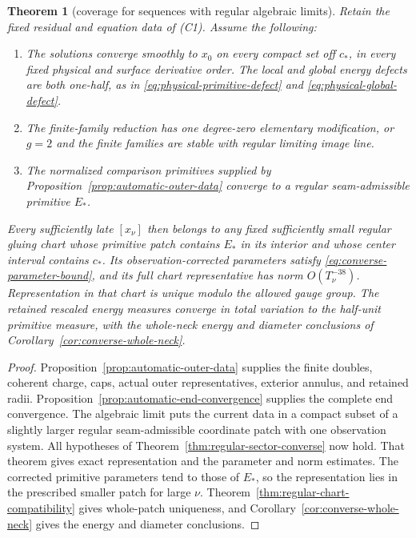 \documentclass[11pt]{amsart}
\newtheorem{theorem}{Theorem}[section]
\theoremstyle{definition}
\theoremstyle{remark}
\theoremstyle{plain}
\begin{document}
\begin{theorem}[coverage for sequences with regular algebraic limits]
\label{thm:physical-sector-coverage}
Retain the fixed residual and equation data of \textup{(C1)}.
Assume the following:
\begin{enumerate}
\item The solutions converge smoothly to $x_0$ on every compact
set off $c_*$, in every fixed physical and surface derivative
order. The local and global energy defects are both one-half,
as in \eqref{eq:physical-primitive-defect} and
\eqref{eq:physical-global-defect}.
\item The finite-family reduction has one degree-zero elementary
modification, or $g=2$ and the finite families are stable with
regular limiting image line.
\item The normalized comparison primitives supplied by
Proposition~\ref{prop:automatic-outer-data} converge to a regular
seam-admissible primitive $E_*$.
\end{enumerate}

Every sufficiently late $[x_\nu]$ then belongs to any fixed
sufficiently small regular gluing chart whose primitive
patch contains $E_*$ in its interior and whose center
interval contains $c_*$. Its observation-corrected
parameters satisfy \eqref{eq:converse-parameter-bound},
and its full chart representative has norm $O(T_\nu^{-38})$.
Representation in that chart is unique modulo the allowed
gauge group. The retained rescaled energy measures converge
in total variation to the half-unit primitive measure, with
the whole-neck energy and diameter conclusions of
Corollary~\ref{cor:converse-whole-neck}.
\end{theorem}

\begin{proof}
Proposition~\ref{prop:automatic-outer-data} supplies the
finite doubles, coherent charge, caps, actual outer
representatives, exterior annulus, and retained radii.
Proposition~\ref{prop:automatic-end-convergence} supplies
the complete end convergence. The algebraic limit puts
the current data in a compact subset of a slightly
larger regular seam-admissible coordinate patch with
one observation system. All hypotheses of
Theorem~\ref{thm:regular-sector-converse} now hold.
That theorem gives exact representation and the
parameter and norm estimates. The corrected primitive
parameters tend to those of $E_*$, so the representation
lies in the prescribed smaller patch for large $\nu$.
Theorem~\ref{thm:regular-chart-compatibility} gives
whole-patch uniqueness, and
Corollary~\ref{cor:converse-whole-neck} gives the
energy and diameter conclusions.
\end{proof}
\end{document}

